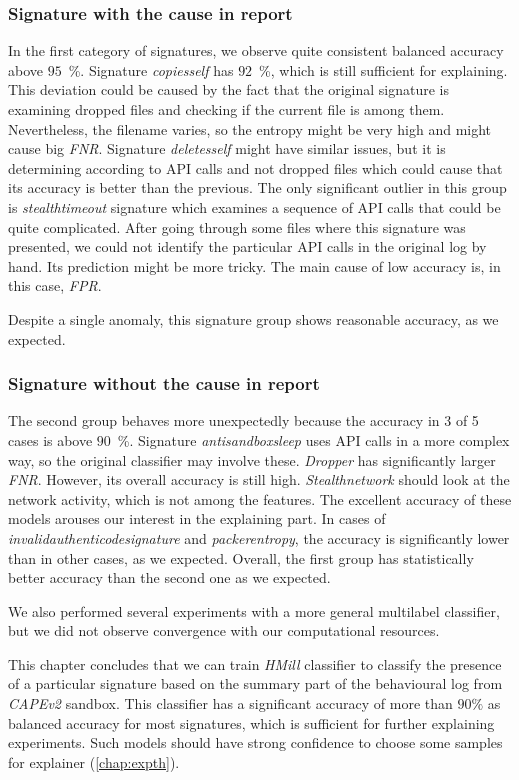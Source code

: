 \subsubsection*{Signature with the cause in report}
In the first category of signatures, we observe quite consistent balanced accuracy above $95$~\%. Signature \emph{copiesself} has $92$~\%, which is still sufficient for explaining. This deviation could be caused by the fact that the original signature is examining dropped files and checking if the current file is among them. Nevertheless, the filename varies, so the entropy might be very high and might cause big \emph{FNR}. Signature \emph{deletesself} might have similar issues, but it is determining according to API calls and not dropped files which could cause that its accuracy is better than the previous. The only significant outlier in this group is \emph{stealthtimeout} signature which examines a sequence of API calls that could be quite complicated. After going through some files where this signature was presented, we could not identify the particular API calls in the original log by hand. Its prediction might be more tricky. The main cause of low accuracy is, in this case, \emph{FPR}.

Despite a single anomaly, this signature group shows reasonable accuracy, as we expected.

\subsubsection*{Signature without the cause in report}
The second group behaves more unexpectedly because the accuracy in 3 of 5 cases is above $90$~\%. Signature \emph{antisandboxsleep} uses API calls in a more complex way, so the original classifier may involve these. \emph{Dropper} has significantly larger \emph{FNR}. However, its overall accuracy is still high. \emph{Stealthnetwork} should look at the network activity, which is not among the features. The excellent accuracy of these models arouses our interest in the explaining part. In cases of \emph{invalidauthenticodesignature} and \emph{packerentropy}, the accuracy is significantly lower than in other cases, as we expected. Overall, the first group has statistically better accuracy than the second one as we expected.

We also performed several experiments with a more general multilabel classifier, but we did not observe convergence with our computational resources.

This chapter concludes that we can train \emph{HMill} classifier to classify the presence of a particular signature based on the summary part of the behavioural log from \emph{CAPEv2} sandbox. This classifier has a significant accuracy of more than $90\%$ as balanced accuracy for most signatures, which is sufficient for further explaining experiments. Such models should have strong confidence to choose some samples for explainer (\ref{chap:expth}). 


